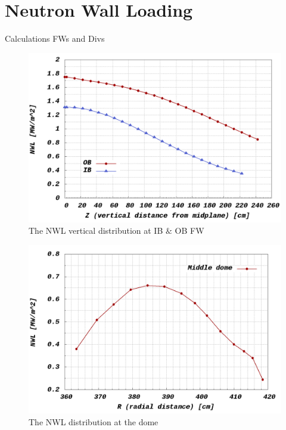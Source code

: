 \documentclass[12pt, letterpaper]{elsarticle}
\begin{document}
\section{Neutron Wall Loading} \label{Neutron Wall Loading}
Calculations FWs and Divs
\begin{figure}[h!]
  \centering
  \includegraphics[scale=0.2]{../plots/NWL_FWs.png}
  \caption{The NWL vertical distribution at IB $\&$ OB FW}
  \label{fig:NWL FWs}
\end{figure}
\begin{figure}[h!]
  \centering
  \includegraphics[scale=0.3]{../plots/NWL_div.png}
  \caption{The NWL distribution at the dome}
  \label{fig:NWL Dome}
\end{figure}
\end{document}
